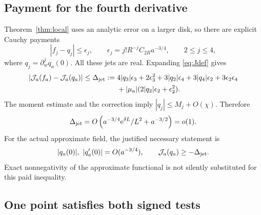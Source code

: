 \subsection{Payment for the fourth derivative}

Theorem~\ref{thm:local} uses an analytic error on a larger disk, so
there are explicit Cauchy payments
\[
 |f_j-q_j|\le\epsilon_j,\qquad
 \epsilon_j=j!R^{-j}C_{2R}a^{-3/4},\qquad 2\le j\le4,
\]
where \(q_j=\partial_w^jq_a(0)\).
All these jets are real. Expanding \eqref{eq:Jdef} gives
\begin{equation}\label{eq:jeterror}
\begin{split}
 |\mathcal J_a(f_a)-\mathcal J_a(q_a)|\le\Delta_{\rm jet}:={}&
 4|q_3|\epsilon_3+2\epsilon_3^2
 +3|q_2|\epsilon_4+3|q_4|\epsilon_2+3\epsilon_2\epsilon_4\\
 &+|\mu_a|(2|q_2|\epsilon_2+\epsilon_2^2).
\end{split}
\end{equation}
The moment estimate and the correction imply
\(|q_j|\le M_j+O(\chi)\). Therefore
\begin{equation}\label{eq:jeterrorsize}
 \Delta_{\rm jet}
 =O\left(a^{-3/4}\mathrm e^{\delta L}/L^2+a^{-3/2}\right)=o(1).
\end{equation}
For the actual approximate field, the justified necessary statement is
\begin{equation}\label{eq:approxjetcondition}
 |q_a(0)|,\ |q_a'(0)|=O(a^{-3/4}),\qquad
 \mathcal J_a(q_a)\ge-\Delta_{\rm jet}.
\end{equation}
Exact nonnegativity of the approximate functional is not silently
substituted for this paid inequality.

\subsection{One point satisfies both signed tests}

